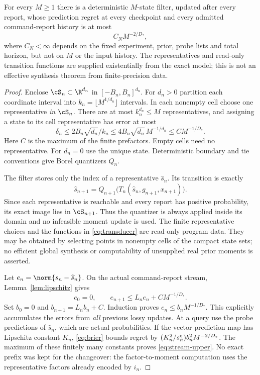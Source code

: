 \begin{theorem}\label{thm:stream-upper}
For every $M\ge1$ there is a deterministic $M$-state filter, updated after
every report, whose prediction regret at every checkpoint and every
admitted command-report history is at most
\begin{equation}\label{eq:stream-upper}
 C_N M^{-2/D_*},
\end{equation}
where $C_N<\infty$ depends on the fixed experiment, prior, probe lists
and total horizon, but not on $M$ or the input history. The representatives
and read-only transition functions are supplied existentially from the exact
model; this is not an effective synthesis theorem from finite-precision data.
\end{theorem}
\begin{proof}
Enclose $\cS_n\subset\R^{d_n}$ in $[-B_n,B_n]^{d_n}$. For $d_n>0$
partition each coordinate interval into
$k_n=\lfloor M^{1/d_n}\rfloor$ intervals. In each nonempty cell choose
one representative \emph{in} $\cS_n$. There are at most $k_n^{d_n}\le M$
representatives, and assigning a state to its cell representative has
error at most
\[
 \delta_n\le 2B_n\sqrt{d_n}/k_n
 \le4B_n\sqrt{d_n}\,M^{-1/d_n}
 \le C M^{-1/D_*}.
\]
Here $C$ is the maximum of the finite prefactors. Empty cells need no
representative. For $d_n=0$ use the unique state. Deterministic boundary
and tie conventions give Borel quantizers $Q_n$.

The filter stores only the index of a representative $\widehat s_n$.
Its transition is exactly
\begin{equation}\label{eq:transducer}
 \widehat s_{n+1}
   =Q_{n+1}\bigl(T_n(\widehat s_n,g_{n+1},x_{n+1})\bigr).
\end{equation}
Since each representative is reachable and every report has positive
probability, its exact image lies in $\cS_{n+1}$. Thus the quantizer is
always applied inside its domain and no infeasible moment update is used.
The finite representative choices and the functions in
\eqref{eq:transducer} are read-only program data. They may be obtained by
selecting points in nonempty cells of the compact state sets; no efficient global synthesis
or computability of unsupplied real prior moments is asserted.

Let $e_n=\norm{s_n-\widehat s_n}$. On the actual command-report stream,
Lemma~\ref{lem:lipschitz} gives
\[
 e_0=0,\qquad e_{n+1}\le L_ne_n+C M^{-1/D_*}.
\]
Set $b_0=0$ and $b_{n+1}=L_nb_n+C$. Induction proves
$e_n\le b_nM^{-1/D_*}$. This explicitly accumulates the errors from
\emph{all} previous lossy updates. At a query use the probe predictions
of $\widehat s_n$, which are actual probabilities. If the vector prediction
map has Lipschitz constant $K_n$, \eqref{eq:brier} bounds regret by
$(K_n^2/s_n^{\rm q})b_n^2 M^{-2/D_*}$. The maximum of these finitely
many constants proves \eqref{eq:stream-upper}. No exact prefix was kept
for the changeover: the factor-to-moment computation uses the representative
factors already encoded by $i_n$.
\end{proof}

